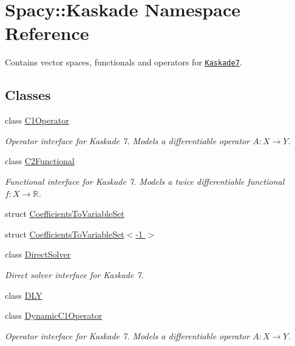 \hypertarget{namespaceSpacy_1_1Kaskade}{}\section{Spacy\+:\+:Kaskade Namespace Reference}
\label{namespaceSpacy_1_1Kaskade}


Contains vector spaces, functionals and operators for \href{http://www.zib.de/projects/kaskade7-finite-element-toolbox}{\tt Kaskade7}.  


\subsection*{Classes}
\begin{DoxyCompactItemize}
\item 
class \hyperlink{classSpacy_1_1Kaskade_1_1C1Operator}{C1\+Operator}
\begin{DoxyCompactList}\small\item\em Operator interface for Kaskade 7. Models a differentiable operator $A:X\rightarrow Y$. \end{DoxyCompactList}\item 
class \hyperlink{classSpacy_1_1Kaskade_1_1C2Functional}{C2\+Functional}
\begin{DoxyCompactList}\small\item\em Functional interface for Kaskade 7. Models a twice differentiable functional $f:X\rightarrow \mathbb{R}$. \end{DoxyCompactList}\item 
struct \hyperlink{structSpacy_1_1Kaskade_1_1CoefficientsToVariableSet}{Coefficients\+To\+Variable\+Set}
\item 
struct \hyperlink{structSpacy_1_1Kaskade_1_1CoefficientsToVariableSet_3-1_01_4}{Coefficients\+To\+Variable\+Set$<$-\/1 $>$}
\item 
class \hyperlink{classSpacy_1_1Kaskade_1_1DirectSolver}{Direct\+Solver}
\begin{DoxyCompactList}\small\item\em Direct solver interface for Kaskade 7. \end{DoxyCompactList}\item 
class \hyperlink{classSpacy_1_1Kaskade_1_1DLY}{D\+LY}
\item 
class \hyperlink{classSpacy_1_1Kaskade_1_1DynamicC1Operator}{Dynamic\+C1\+Operator}
\begin{DoxyCompactList}\small\item\em Operator interface for Kaskade 7. Models a differentiable operator $A:X\rightarrow Y$. \end{DoxyCompactList}\item 

\end{DoxyCompactItemize}
